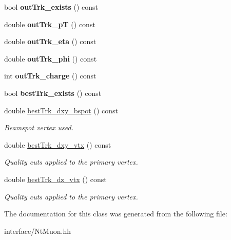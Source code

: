 \begin{DoxyCompactItemize}
\item 
\hypertarget{classran_1_1NtMuon_af82d2cdae57591f1c47e12366617a5e3}{bool {\bfseries out\-Trk\-\_\-exists} () const }\label{classran_1_1NtMuon_af82d2cdae57591f1c47e12366617a5e3}

\item 
\hypertarget{classran_1_1NtMuon_a6f42b91c697b086b7ebcc682088df217}{double {\bfseries out\-Trk\-\_\-p\-T} () const }\label{classran_1_1NtMuon_a6f42b91c697b086b7ebcc682088df217}

\item 
\hypertarget{classran_1_1NtMuon_a1067b07c94a3ca9465c11cb9520d3083}{double {\bfseries out\-Trk\-\_\-eta} () const }\label{classran_1_1NtMuon_a1067b07c94a3ca9465c11cb9520d3083}

\item 
\hypertarget{classran_1_1NtMuon_abccf52d1154bbce2c3d6c2b8be7cef14}{double {\bfseries out\-Trk\-\_\-phi} () const }\label{classran_1_1NtMuon_abccf52d1154bbce2c3d6c2b8be7cef14}

\item 
\hypertarget{classran_1_1NtMuon_a06cc92e801672aa0d1c2367b3d9ca1b4}{int {\bfseries out\-Trk\-\_\-charge} () const }\label{classran_1_1NtMuon_a06cc92e801672aa0d1c2367b3d9ca1b4}

\item 
\hypertarget{classran_1_1NtMuon_a5d4bf7c61c5ca90892cdd36b30d89af3}{bool {\bfseries best\-Trk\-\_\-exists} () const }\label{classran_1_1NtMuon_a5d4bf7c61c5ca90892cdd36b30d89af3}

\item 
\hypertarget{classran_1_1NtMuon_a89ca8236ad6aca950dad5dc8f4b2de55}{double \hyperlink{classran_1_1NtMuon_a89ca8236ad6aca950dad5dc8f4b2de55}{best\-Trk\-\_\-dxy\-\_\-bspot} () const }\label{classran_1_1NtMuon_a89ca8236ad6aca950dad5dc8f4b2de55}

\begin{DoxyCompactList}\small\item\em Beamspot vertex used. \end{DoxyCompactList}\item 
\hypertarget{classran_1_1NtMuon_a6eb5575058e32e7a2ec1985dc78c89bc}{double \hyperlink{classran_1_1NtMuon_a6eb5575058e32e7a2ec1985dc78c89bc}{best\-Trk\-\_\-dxy\-\_\-vtx} () const }\label{classran_1_1NtMuon_a6eb5575058e32e7a2ec1985dc78c89bc}

\begin{DoxyCompactList}\small\item\em Quality cuts applied to the primary vertex. \end{DoxyCompactList}\item 
\hypertarget{classran_1_1NtMuon_a71ef775fdb73e20a1536e692d0452a20}{double \hyperlink{classran_1_1NtMuon_a71ef775fdb73e20a1536e692d0452a20}{best\-Trk\-\_\-dz\-\_\-vtx} () const }\label{classran_1_1NtMuon_a71ef775fdb73e20a1536e692d0452a20}

\begin{DoxyCompactList}\small\item\em Quality cuts applied to the primary vertex. \end{DoxyCompactList}\end{DoxyCompactItemize}


The documentation for this class was generated from the following file\-:\begin{DoxyCompactItemize}
\item 
interface/Nt\-Muon.\-hh\end{DoxyCompactItemize}

